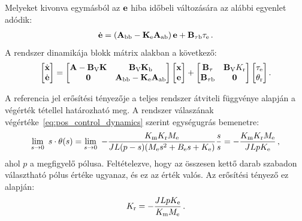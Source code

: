 Melyeket kivonva egymásból az \(\mathbf{e}\) hiba időbeli változására az alábbi egyenlet adódik:
\begin{align}
    \dot{\mathbf{e}} = \left(\mathbf{A}_{\mathrm{bb}} - \mathbf{K}_{\mathrm{e}} \mathbf{A}_{\mathrm{ab}}\right) \mathbf{e} + \mathbf{B}_{\mathrm{\tau b}} \tau_{\mathrm{e}}\,.
\end{align}
A rendszer dinamikája blokk mátrix alakban a következő:
\begin{align}\label{eq:pos_control_dynamics}
    \begin{bmatrix}
        \dot{\mathbf{x}} \\
        \dot{\mathbf{e}}
    \end{bmatrix}
    =
    \begin{bmatrix}
        \mathbf{A} - \mathbf{B}_{\mathrm{V}} \mathbf{K} & \mathbf{B}_{\mathrm{V}} \mathbf{K}_{\mathrm{b}} \\
        \mathbf{0} & \mathbf{A}_{\mathrm{bb}} - \mathbf{K}_{\mathrm{e}} \mathbf{A}_{\mathrm{ab}}
    \end{bmatrix}
    \begin{bmatrix}
        \mathbf{x} \\
        \mathbf{e}
    \end{bmatrix}
    +
    \begin{bmatrix}
        \mathbf{B}_{\mathrm{\tau}} & \mathbf{B}_{\mathrm{V}} K_{\mathrm{r}}\\
        \mathbf{B}_{\mathrm{\tau b}} & \mathbf{0}
    \end{bmatrix}
    \begin{bmatrix}
        \tau_{\mathrm{e}} \\
        \theta_{\mathrm{r}}
    \end{bmatrix}.
\end{align}

A referencia jel erősítési tényezője a teljes rendszer átviteli függvénye alapján a végérték tétellel határozható meg.
A rendszer válaszának végértéke~\eqref{eq:pos_control_dynamics} szerint egységugrás bemenetre:
\begin{equation}\label{eq:input_gain}
    \lim_{s \to 0}~s \cdot \theta(s) = 
    \lim_{s \to 0}~-\frac{K_{\mathrm{m}} K_{\mathrm{r}} M_{\mathrm{e}}}{JL(p-s)(M_{\mathrm{e}} s^2 + B_{\mathrm{e}} s + K_{\mathrm{e}})}\frac{s}{s} =
    -\frac{K_{\mathrm{m}} K_{\mathrm{r}} M_{\mathrm{e}}}{JLpK_{\mathrm{e}}}\,,
\end{equation}
ahol \(p\) a megfigyelő pólusa.
Feltételezve, hogy az összesen kettő darab szabadon választható pólus értéke ugyanaz, 
és ez az érték valós. Az erősítési tényező ez alapján:
\begin{equation}\label{eq:input_coeff}
    K_{\mathrm{r}} = -\frac{JLpK_{\mathrm{e}}}{K_{\mathrm{m}} M_{\mathrm{e}}}\,.
\end{equation}

